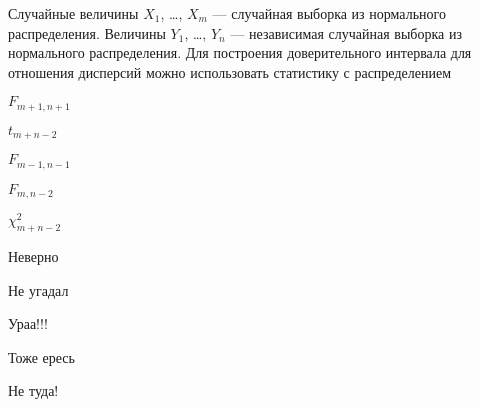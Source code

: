 
\begin{question}
Случайные величины \(X_1\), \ldots, \(X_m\) --- случайная выборка из
нормального распределения. Величины \(Y_1\), \ldots, \(Y_n\) ---
независимая случайная выборка из нормального распределения. Для
построения доверительного интервала для отношения дисперсий можно
использовать статистику с распределением
\begin{answerlist}
  \item \(F_{m+1,n+1}\)
  \item \(t_{m+n-2}\)
  \item \(F_{m-1, n-1}\)
  \item \(F_{m,n-2}\)
  \item \(\chi^2_{m+n-2}\)
\end{answerlist}
\end{question}

\begin{solution}
\begin{answerlist}
  \item Неверно
  \item Не угадал
  \item Ураа!!!
  \item Тоже ересь
  \item Не туда!
\end{answerlist}
\end{solution}

